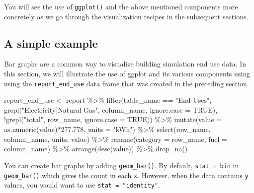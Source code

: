 \documentclass[
]{book}
\newenvironment{Shaded}{\begin{snugshade}}{\end{snugshade}}
\newcommand{\AttributeTok}[1]{\textcolor[rgb]{0.77,0.63,0.00}{#1}}
\newcommand{\ConstantTok}[1]{\textcolor[rgb]{0.00,0.00,0.00}{#1}}
\newcommand{\FloatTok}[1]{\textcolor[rgb]{0.00,0.00,0.81}{#1}}
\newcommand{\FunctionTok}[1]{\textcolor[rgb]{0.00,0.00,0.00}{#1}}
\newcommand{\NormalTok}[1]{#1}
\newcommand{\OtherTok}[1]{\textcolor[rgb]{0.56,0.35,0.01}{#1}}
\newcommand{\SpecialCharTok}[1]{\textcolor[rgb]{0.00,0.00,0.00}{#1}}
\newcommand{\StringTok}[1]{\textcolor[rgb]{0.31,0.60,0.02}{#1}}
\begin{document}
You will see the use of \texttt{ggplot()} and the above mentioned components more concretely as we go through the visualization recipes in the subsequent sections.

\hypertarget{a-simple-example}{%
\subsection{A simple example}\label{a-simple-example}}

Bar graphs are a common way to visualize building simulation end use data. In this section, we will illustrate the use of ggplot and its various components using using the \texttt{report\_end\_use} data frame that was created in the preceding section.

\begin{Shaded}
\begin{Highlighting}[]
\NormalTok{report\_end\_use }\OtherTok{\textless{}{-}}\NormalTok{ report }\SpecialCharTok{\%\textgreater{}\%}
    \FunctionTok{filter}\NormalTok{(table\_name }\SpecialCharTok{==} \StringTok{"End Uses"}\NormalTok{, }
           \FunctionTok{grepl}\NormalTok{(}\StringTok{"Electricity|Natural Gas"}\NormalTok{, column\_name, }\AttributeTok{ignore.case =} \ConstantTok{TRUE}\NormalTok{),}
           \SpecialCharTok{!}\FunctionTok{grepl}\NormalTok{(}\StringTok{"total"}\NormalTok{, row\_name, }\AttributeTok{ignore.case =} \ConstantTok{TRUE}\NormalTok{)) }\SpecialCharTok{\%\textgreater{}\%}
    \FunctionTok{mutate}\NormalTok{(}\AttributeTok{value =} \FunctionTok{as.numeric}\NormalTok{(value)}\SpecialCharTok{*}\FloatTok{277.778}\NormalTok{,}
           \AttributeTok{units =} \StringTok{"kWh"}\NormalTok{) }\SpecialCharTok{\%\textgreater{}\%}
    \FunctionTok{select}\NormalTok{(row\_name, column\_name, units, value) }\SpecialCharTok{\%\textgreater{}\%}
    \FunctionTok{rename}\NormalTok{(}\AttributeTok{category =}\NormalTok{ row\_name, }\AttributeTok{fuel =}\NormalTok{ column\_name) }\SpecialCharTok{\%\textgreater{}\%}
    \FunctionTok{arrange}\NormalTok{(}\FunctionTok{desc}\NormalTok{(value)) }\SpecialCharTok{\%\textgreater{}\%}
    \FunctionTok{drop\_na}\NormalTok{()}
\end{Highlighting}
\end{Shaded}

You can create bar graphs by adding \texttt{geom\_bar()}. By default, \texttt{stat\ =\ bin} in \texttt{geom\_bar()} which gives the count in each \texttt{x}. However, when the data contains \texttt{y} values, you would want to use \texttt{stat\ =\ "identity"}.
\end{document}
